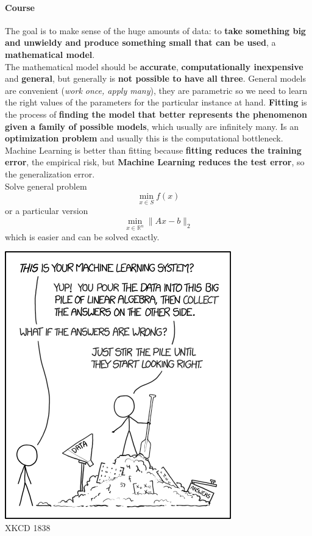 \documentclass[10pt]{report}
\begin{document}
\paragraph{Course} The goal is to make sense of the huge amounts of data: to \textbf{take something big and unwieldy and produce something small that can be used}, a \textbf{mathematical model}.\\
The mathematical model should be \textbf{accurate}, \textbf{computationally inexpensive} and \textbf{general}, but generally is \textbf{not possible to have all three}. General models are convenient (\textit{work once, apply many}), they are parametric so we need to learn the right values of the parameters for the particular instance at hand. \textbf{Fitting} is the process of \textbf{finding the model that better represents the phenomenon given a family of possible models}, which usually are infinitely many. Is an \textbf{optimization problem} and usually this is the computational bottleneck.\\
Machine Learning is better than fitting because \textbf{fitting reduces the training error}, the empirical risk, but \textbf{Machine Learning reduces the test error}, so the generalization error.\\
Solve general problem $$\min_{x\in S}f(x)$$ or a particular version $$\min_{x\in \mathbb{R}^n}\|Ax - b\|_2$$ which is easier and can be solved exactly.
\begin{center}
	\includegraphics[scale=0.75]{xkcd_1838.png}\\
	XKCD 1838
\end{center}
\end{document}
